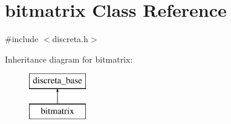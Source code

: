\hypertarget{classbitmatrix}{}\section{bitmatrix Class Reference}
\label{classbitmatrix}


{\ttfamily \#include $<$discreta.\+h$>$}

Inheritance diagram for bitmatrix\+:\begin{figure}[H]
\begin{center}
\leavevmode
\includegraphics[height=2.000000cm]{classbitmatrix}
\end{center}
\end{figure}
